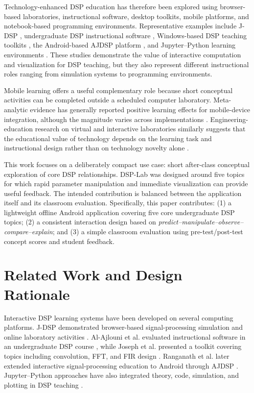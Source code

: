 \documentclass[11pt,a4paper]{article}
\begin{document}
Technology-enhanced DSP education has therefore been explored using browser-based laboratories, instructional software, desktop toolkits, mobile platforms, and notebook-based programming environments. Representative examples include J-DSP \citep{spanias2005}, undergraduate DSP instructional software \citep{alajlouni2010}, Windows-based DSP teaching toolkits \citep{joseph2017}, the Android-based AJDSP platform \citep{ranganath2019}, and Jupyter--Python learning environments \citep{zuniga2020}. These studies demonstrate the value of interactive computation and visualization for DSP teaching, but they also represent different instructional roles ranging from simulation systems to programming environments.

Mobile learning offers a useful complementary role because short conceptual activities can be completed outside a scheduled computer laboratory. Meta-analytic evidence has generally reported positive learning effects for mobile-device integration, although the magnitude varies across implementations \citep{sung2016,garzon2025}. Engineering-education research on virtual and interactive laboratories similarly suggests that the educational value of technology depends on the learning task and instructional design rather than on technology novelty alone \citep{potkonjak2016,li2024}.

This work focuses on a deliberately compact use case: short after-class conceptual exploration of core DSP relationships. DSP-Lab was designed around five topics for which rapid parameter manipulation and immediate visualization can provide useful feedback. The intended contribution is balanced between the application itself and its classroom evaluation. Specifically, this paper contributes: (1) a lightweight offline Android application covering five core undergraduate DSP topics; (2) a consistent interaction design based on \emph{predict--manipulate--observe--compare--explain}; and (3) a simple classroom evaluation using pre-test/post-test concept scores and student feedback.

\section{Related Work and Design Rationale}
Interactive DSP learning systems have been developed on several computing platforms. J-DSP demonstrated browser-based signal-processing simulation and online laboratory activities \citep{spanias2005}. Al-Ajlouni et al. evaluated instructional software in an undergraduate DSP course \citep{alajlouni2010}, while Joseph et al. presented a toolkit covering topics including convolution, FFT, and FIR design \citep{joseph2017}. Ranganath et al. later extended interactive signal-processing education to Android through AJDSP \citep{ranganath2019}. Jupyter--Python approaches have also integrated theory, code, simulation, and plotting in DSP teaching \citep{zuniga2020}.
\end{document}
